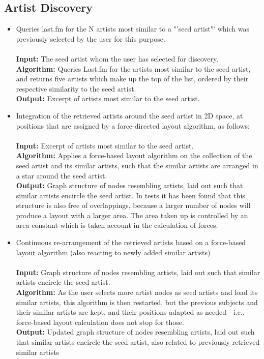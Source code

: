 \subsection{Artist Discovery}

\begin{itemize}
	\item Queries last.fm for the N artists most similar to a "'seed artist"' which was previously selected by the user for this purpose.\\\\
				\textbf{Input:} The seed artist whom the user has selected for discovery. \\
				\textbf{Algorithm:} Queries Last.fm for the artists most similar to the seed artist, and returns five artists which make up the top of the list, ordered by their respective similarity to the seed artist. \\
				\textbf{Output:} Excerpt of artists most similar to the seed artist. \\
	\item Integration of the retrieved artists around the seed artist in 2D space, at positions that are assigned by a force-directed layout algorithm, as follows: \\\\
				\textbf{Input:} Excerpt of artists most similar to the seed artist. \\
				\textbf{Algorithm:} Applies a force-based layout algorithm on the collection of the seed artist and	its similar artists, such that the similar artists are arranged in a star around the seed artist. \\
				\textbf{Output:} Graph structure of nodes resembling artists, laid out such that similar artists encircle the seed artist. In tests it has been found that this structure is also free of overlappings, because a larger number of nodes will produce a layout with a larger area. The area taken up is controlled by an area constant which is taken account in the calculation of forces. \\
	\item Continuous re-arrangement of the retrieved artists based on a force-based layout algorithm (also reacting to newly added similar artists) \\\\
				\textbf{Input:} Graph structure of nodes resembling artists, laid out such that similar	artists encircle the seed artist. \\
				\textbf{Algorithm:} As the user selects more artist nodes as seed artists and load its similar artists, this algorithm is then restarted, but the previous subjects and their	similar artists are kept, and their positions adapted as needed - i.e., force-based layout calculation does not stop for those. \\
				\textbf{Output:} Updated graph structure of nodes resembling artists, laid out such that similar artists encircle the seed artist, also related to previously retrieved similar artists \\
\end{itemize}

